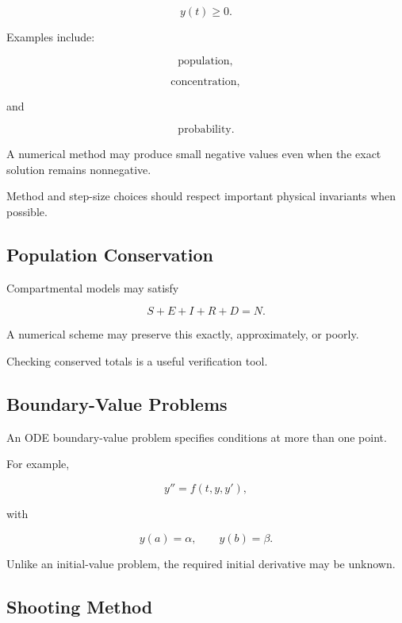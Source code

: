 \[
\boxed{
y(t)\geq0.
}
\]

Examples include:

\[
\boxed{
\text{population},
}
\]

\[
\boxed{
\text{concentration},
}
\]

and

\[
\boxed{
\text{probability}.
}
\]

A numerical method may produce small negative values even when the exact
solution remains nonnegative.

Method and step-size choices should respect important physical invariants
when possible.

\subsection{Population Conservation}
\label{subsec:population-conservation}

Compartmental models may satisfy

\[
\boxed{
S+E+I+R+D=N.
}
\]

A numerical scheme may preserve this exactly, approximately, or poorly.

Checking conserved totals is a useful verification tool.

\subsection{Boundary-Value Problems}
\label{subsec:numerical-ode-boundary-value}

An ODE boundary-value problem specifies conditions at more than one point.

For example,

\[
\boxed{
y''=f(t,y,y'),
}
\]

with

\[
\boxed{
y(a)=\alpha,
\qquad
y(b)=\beta.
}
\]

Unlike an initial-value problem, the required initial derivative may be
unknown.

\subsection{Shooting Method}
\label{subsec:ode-shooting-method}

